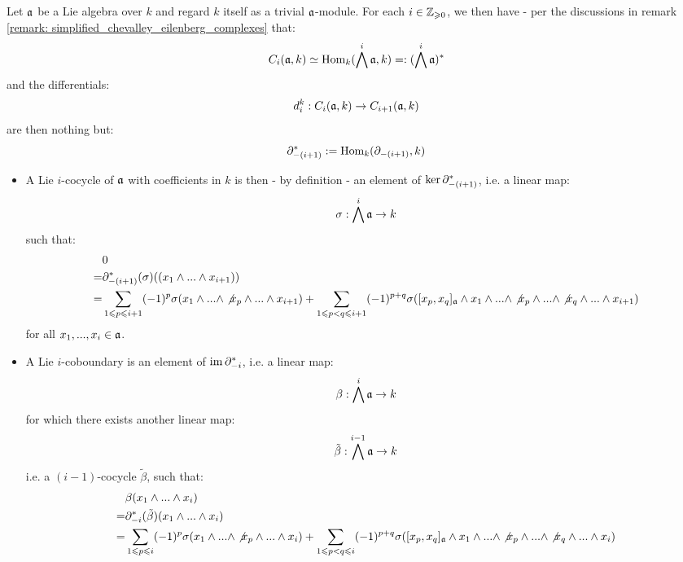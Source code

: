         \begin{example} \label{example: lie_cocycles_and_coboundaries_with_trivial_coefficients}
            Let $\mathfrak{a}$ be a Lie algebra over $k$ and regard $k$ itself as a trivial $\mathfrak{a}$-module. For each $i \in \mathbb{Z}_{\geqslant 0}$, we then have - per the discussions in remark \ref{remark: simplified_chevalley_eilenberg_complexes} that:
                $$C_i(\mathfrak{a}, k) \simeq \mathrm{Hom}_k(\bigwedge^i \mathfrak{a}, k) =: (\bigwedge^i \mathfrak{a})^*$$
            and the differentials:
                $$d_i^k: C_i(\mathfrak{a}, k) \to C_{i + 1}(\mathfrak{a}, k)$$
            are then nothing but:
                $$\partial_{-(i + 1)}^* := \mathrm{Hom}_k(\partial_{-(i + 1)}, k)$$
            \begin{itemize}
                \item A Lie $i$-cocycle of $\mathfrak{a}$ with coefficients in $k$ is then - by definition - an element of $\ker \partial_{-(i + 1)}^*$, i.e. a linear map:
                    $$\sigma: \bigwedge^i \mathfrak{a} \to k$$
                such that:
                    $$
                        \begin{aligned}
                            & 0
                            \\
                            = & \partial_{-(i + 1)}^*(\sigma)( (x_1 \wedge ... \wedge x_{i + 1}) )
                            \\
                            = & \sum_{1 \leqslant p \leqslant i + 1} (-1)^p \sigma(x_1 \wedge ... \wedge \not{x_p} \wedge ... \wedge x_{i + 1}) + \sum_{1 \leqslant p < q \leqslant i + 1} (-1)^{p + q} \sigma( [x_p, x_q]_{\mathfrak{a}} \wedge x_1 \wedge ... \wedge \not{x_p} \wedge ... \wedge \not{x_q} \wedge ... \wedge x_{i + 1})
                        \end{aligned}
                    $$
                for all $x_1, ..., x_i \in \mathfrak{a}$.
                \item A Lie $i$-coboundary is an element of $\operatorname{im} \partial_{-i}^*$, i.e. a linear map:
                    $$\beta: \bigwedge^i \mathfrak{a} \to k$$
                for which there exists another linear map:
                    $$\tilde{\beta}: \bigwedge^{i - 1} \mathfrak{a} \to k$$
                i.e. a $(i - 1)$-cocycle $\tilde{\beta}$, such that:
                    $$
                        \begin{aligned}
                            & \beta(x_1 \wedge ... \wedge x_i)
                            \\
                            = & \partial_{-i}^*(\tilde{\beta})(x_1 \wedge ... \wedge x_i)
                            \\
                            = & \sum_{1 \leqslant p \leqslant i} (-1)^p \sigma(x_1 \wedge ... \wedge \not{x_p} \wedge ... \wedge x_i) + \sum_{1 \leqslant p < q \leqslant i} (-1)^{p + q} \sigma( [x_p, x_q]_{\mathfrak{a}} \wedge x_1 \wedge ... \wedge \not{x_p} \wedge ... \wedge \not{x_q} \wedge ... \wedge x_i)
                        \end{aligned}
                    $$
            \end{itemize}
        \end{example}
